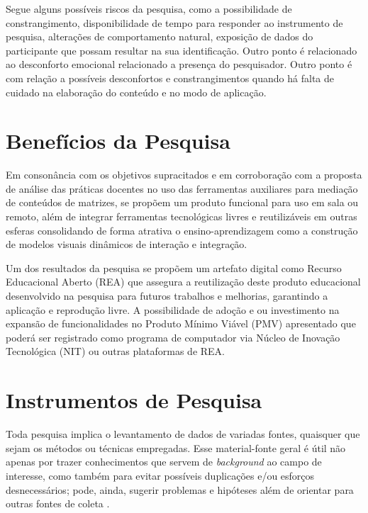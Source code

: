 Segue alguns possíveis riscos da pesquisa, como a possibilidade de constrangimento, disponibilidade de tempo para responder ao instrumento de pesquisa, alterações de comportamento natural, exposição de dados do participante que possam resultar na sua identificação. Outro ponto é relacionado ao desconforto emocional relacionado a presença do pesquisador. Outro ponto é com relação a possíveis desconfortos e constrangimentos quando há falta de cuidado na elaboração do conteúdo e no modo de aplicação.






\section{Benefícios da Pesquisa}
\label{beneficios_pesquisa}

Em consonância com os objetivos supracitados e em corroboração com a proposta de análise das práticas docentes no uso das ferramentas auxiliares para mediação de conteúdos de matrizes, se propõem um produto funcional para uso em sala ou remoto, além de integrar ferramentas tecnológicas livres e reutilizáveis em outras esferas consolidando de forma atrativa o ensino-aprendizagem como a construção de modelos visuais dinâmicos de interação e integração. 

Um dos resultados da pesquisa se propõem um artefato digital como Recurso Educacional Aberto (REA) que assegura a reutilização deste produto educacional desenvolvido na pesquisa para futuros trabalhos e melhorias, garantindo a aplicação e reprodução livre. A possibilidade de adoção e ou investimento na expansão de funcionalidades no Produto Mínimo Viável (PMV) apresentado que poderá ser registrado como programa de computador via Núcleo de Inovação Tecnológica (NIT) ou outras plataformas de REA.






\section{Instrumentos de Pesquisa}
\label{instrumentos}

Toda pesquisa implica o levantamento de dados de variadas fontes, quaisquer que sejam os métodos ou técnicas empregadas. Esse material-fonte geral é útil não apenas por trazer conhecimentos que servem de \textit{background} ao campo de interesse, como também para evitar possíveis duplicações e/ou esforços desnecessários; pode, ainda, sugerir problemas e hipóteses além de orientar para outras fontes de coleta \cite{marconi2017fundamentos}.


